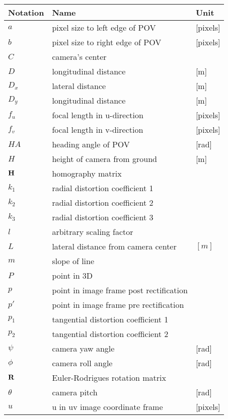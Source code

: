 \begin{table}[H]
    \centering
    \begin{tabular}{l|l|l}
         \bf{Notation} & \bf{Name} & \bf{Unit}  \\ \hline
         $a$ & pixel size to left edge of POV & [pixels]\\
         $b$ & pixel size to right edge of POV & [pixels] \\
         $C$ & camera's center & \\
         $D$ & longitudinal distance & [m] \\
         $D_x$ & lateral distance & [m] \\
         $D_y$ & longitudinal distance & [m] \\
         $f_u$ & focal length in u-direction & [pixels] \\
         $f_v$ & focal length in v-direction & [pixels]\\
         $HA$ & heading angle of POV & [rad] \\
         $H$ & height of camera from ground & [m] \\
         $\bf{H}$ & homography matrix & \\
         $k_1$ & radial distortion coefficient 1 & \\
         $k_2$ & radial distortion coefficient 2 & \\
         $k_3$ & radial distortion coefficient 3 & \\
         $l$ & arbitrary scaling factor & \\
         $L$ & lateral distance from camera center & $[m]$\\
         $m$ & slope of line & \\
         $P$ & point in 3D &  \\
         $p$ & point in image frame post rectification & \\
         $p'$ & point in image frame pre rectification & \\
         $p_1$ & tangential distortion coefficient 1 & \\
         $p_2$ & tangential distortion coefficient 2 & \\
         $\psi$ & camera yaw angle & [rad]\\
         $\phi$ & camera roll angle & [rad]\\
         $\bf{R}$ & Euler-Rodrigues rotation matrix & \\
         $\theta$ & camera pitch & [rad]\\
         $u$ & u in uv image coordinate frame & [pixels] \\

\end{tabular}
\end{table}
